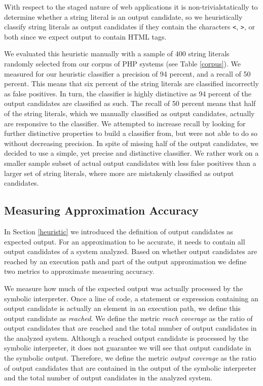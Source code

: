 \documentclass[sigconf]{acmart}
\renewcommand{\tt}[1]{\texttt{#1}}
\begin{document}
With respect to the staged nature of web applications it is
non-trivialstatically to determine whether a string literal is an output
candidate, so we heuristically classify string literals as output candidates if
they contain the characters \tt{<}, \tt{>}, or both since we expect output to
contain HTML tags.

We evaluated this heuristic manually with a sample of 400 string
literals randomly selected from our corpus of PHP systems (see Table
\ref{corpus}). We measured for our heuristic classifier a precision of 94 percent, and a
recall of 50 percent. This means that six percent of the string literals are
classified incorrectly as false positives. In turn, the classifier is highly
distinctive as 94 percent of the output candidates are classified as such. The
recall of 50 percent means that half of the string literals, which we manually 
classified as output candidates, actually are responsive to the classifier. We
attempted to increase recall by looking for further distinctive properties to build a
classifier from, but were not able to do so without decreasing precision. 
In spite of missing half of the output candidates, we decided
to use a simple, yet precise and distinctive classifier. We rather work on a
smaller sample subset of actual output candidates with less false positives
than a larger set of string literals, where more are mistakenly classified as
output candidates.

\subsection{Measuring Approximation Accuracy}
\label{HowAccurateIsOurApproximation} 
In Section \ref{heuristic} we introduced the definition of output candidates as
expected output. For an approximation to be accurate, it needs to contain
all output candidates of a system analyzed. Based on whether output
candidates are reached by an execution path and part of the output
approximation we define two metrics to approximate measuring accuracy.

We measure how much of the expected output was actually processed by the
symbolic interpreter. Once a line of code, a statement or expression
containing an output candidate is actually an element in an execution path, we
define this output candidate as \emph{reached}. We define the metric \emph{reach
coverage} as the ratio of output candidates that are reached and the total
number of output candidates in the analyzed system. Although a reached output
candidate is processed by the symbolic interpreter, it does not guarantee we
will see that output candidate in the symbolic output. Therefore, we define the
metric \emph{output coverage} as the ratio of output candidates that are
contained in the output of the symbolic interpreter and the total number of
output candidates in the analyzed system.  
\end{document}
